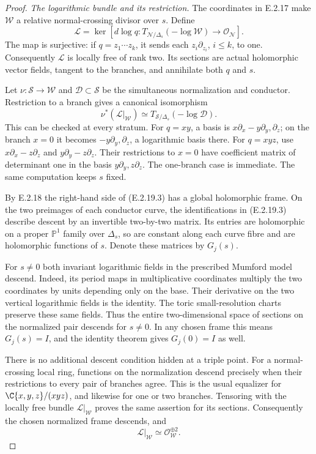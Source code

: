 \begin{proof}
\emph{The logarithmic bundle and its restriction.}
The coordinates in E.2.17 make $\mathcal W$ a
relative normal-crossing divisor over $s$.
Define
\[
 \mathcal L=
 \ker\left[
 d\log q:
 T_{\mathcal N/\Delta_s}(-\log\mathcal W)
       \longrightarrow\mathcal O_{\mathcal N}
 \right].
 \tag{E.2.19.2}
\]
The map is surjective: if
$q=z_1\cdots z_k$, it sends each
$z_i\partial_{z_i}$, $i\leq k$, to one.
Consequently $\mathcal L$ is locally free of
rank two.  Its sections are actual holomorphic
vector fields, tangent to the branches, and
annihilate both $q$ and $s$.

Let $\nu:\mathcal S\to\mathcal W$ and
$\mathcal D\subset\mathcal S$ be the
simultaneous normalization and conductor.
Restriction to a branch gives a canonical
isomorphism
\[
 \nu^*(\mathcal L|_{\mathcal W})
 \simeq T_{\mathcal S/\Delta_s}(-\log\mathcal D).
 \tag{E.2.19.3}
\]
This can be checked at every stratum.  For
$q=xy$, a basis is
$x\partial_x-y\partial_y,\partial_z$;
on the branch $x=0$ it becomes
$-y\partial_y,\partial_z$, a logarithmic
basis there.  For $q=xyz$, use
$x\partial_x-z\partial_z$ and
$y\partial_y-z\partial_z$.  Their
restrictions to $x=0$ have coefficient
matrix of determinant one in the basis
$y\partial_y,z\partial_z$.
The one-branch case is immediate.
The same computation keeps $s$ fixed.

By E.2.18 the right-hand side of
(E.2.19.3) has a global holomorphic
frame.  On the two preimages of each
conductor curve, the identifications
in (E.2.19.3) describe descent by an
invertible two-by-two matrix.  Its
entries are holomorphic on a proper
$\mathbb P^1$ family over $\Delta_s$,
so are constant along each curve
fibre and are holomorphic functions
of $s$.  Denote these matrices by
$G_j(s)$.

For $s\ne0$ both invariant logarithmic
fields in the prescribed Mumford model
descend.  Indeed, its period maps in
multiplicative coordinates multiply
the two coordinates by units depending
only on the base.  Their derivative
on the two vertical logarithmic
fields is the identity.  The toric
small-resolution charts preserve
these same fields.  Thus the entire
two-dimensional space of sections
on the normalized pair descends for
$s\ne0$.  In any chosen frame this
means $G_j(s)=I$, and the identity
theorem gives $G_j(0)=I$ as well.

There is no additional descent
condition hidden at a triple point.
For a normal-crossing local ring,
functions on the normalization
descend precisely when their
restrictions to every pair of
branches agree.  This is the usual
equalizer for
$\C\{x,y,z\}/(xyz)$, and likewise
for one or two branches.  Tensoring
with the locally free bundle
$\mathcal L|_{\mathcal W}$ proves
the same assertion for its sections.
Consequently the chosen normalized
frame descends, and
\[
 \mathcal L|_{\mathcal W}
       \simeq\mathcal O_{\mathcal W}^{\oplus2}.
 \tag{E.2.19.4}
\]


\end{proof}

